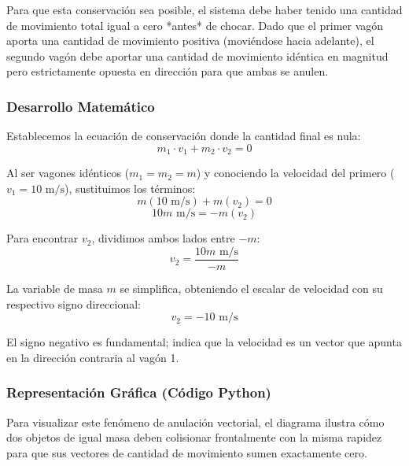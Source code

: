 \documentclass{article}
\begin{document}
Para que esta conservación sea posible, el sistema debe haber tenido una cantidad de movimiento total igual a cero *antes* de chocar. Dado que el primer vagón aporta una cantidad de movimiento positiva (moviéndose hacia adelante), el segundo vagón debe aportar una cantidad de movimiento idéntica en magnitud pero estrictamente opuesta en dirección para que ambas se anulen.

\subsubsection*{Desarrollo Matemático}
Establecemos la ecuación de conservación donde la cantidad final es nula:
$$m_1 \cdot v_1 + m_2 \cdot v_2 = 0$$

Al ser vagones idénticos ($m_1 = m_2 = m$) y conociendo la velocidad del primero ($v_1 = 10 \text{ m/s}$), sustituimos los términos:
$$m(10 \text{ m/s}) + m(v_2) = 0$$
$$10m \text{ m/s} = -m(v_2)$$

Para encontrar $v_2$, dividimos ambos lados entre $-m$:
$$v_2 = \frac{10m \text{ m/s}}{-m}$$

La variable de masa $m$ se simplifica, obteniendo el escalar de velocidad con su respectivo signo direccional:
$$v_2 = -10 \text{ m/s}$$

El signo negativo es fundamental; indica que la velocidad es un vector que apunta en la dirección contraria al vagón 1.

\subsubsection*{Representación Gráfica (Código Python)}
Para visualizar este fenómeno de anulación vectorial, el diagrama ilustra cómo dos objetos de igual masa deben colisionar frontalmente con la misma rapidez para que sus vectores de cantidad de movimiento sumen exactamente cero.
\end{document}
